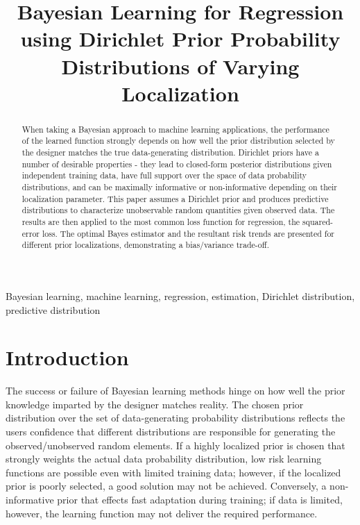 \documentclass{article}
\title{Bayesian Learning for Regression using Dirichlet Prior Probability Distributions of Varying Localization}
\begin{document}
\maketitle


\begin{abstract}
When taking a Bayesian approach to machine learning applications, the performance of the learned function strongly depends on how well the prior distribution selected by the designer matches the true data-generating distribution. Dirichlet priors have a number of desirable properties - they lead to closed-form posterior distributions given independent training data, have full support over the space of data probability distributions, and can be maximally informative or non-informative depending on their localization parameter. This paper assumes a Dirichlet prior and produces predictive distributions to characterize unobservable random quantities given observed data. The results are then applied to the most common loss function for regression, the squared-error loss. The optimal Bayes estimator and the resultant risk trends are presented for different prior localizations, demonstrating a bias/variance trade-off.
\end{abstract}

\begin{keywords}
Bayesian learning, machine learning, regression, estimation, Dirichlet distribution, predictive distribution
\end{keywords}



\section{Introduction}

The success or failure of Bayesian learning methods hinge on how well the prior knowledge imparted by the designer matches reality. The chosen prior distribution over the set of data-generating probability distributions reflects the users confidence that different distributions are responsible for generating the observed/unobserved random elements. If a highly localized prior is chosen that strongly weights the actual data probability distribution, low risk learning functions are possible even with limited training data; however, if the localized prior is poorly selected, a good solution may not be achieved. Conversely, a non-informative prior that effects fast adaptation during training; if data is limited, however, the learning function may not deliver the required performance.
\end{document}
